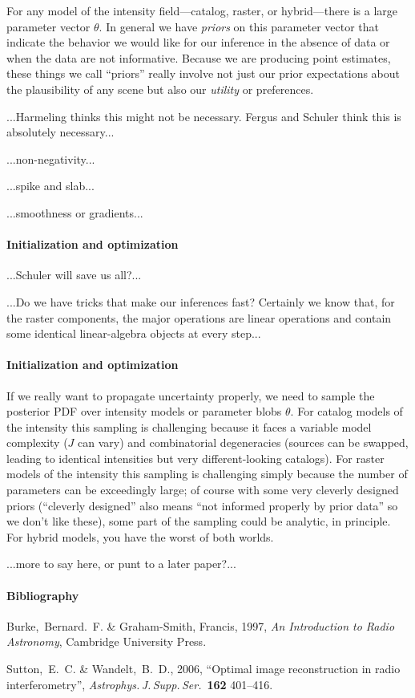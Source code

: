 \documentclass[12pt]{article}
\begin{document}
For any model of the intensity field---catalog, raster, or
hybrid---there is a large parameter vector $\theta$.  In general we
have \emph{priors} on this parameter vector that indicate the behavior
we would like for our inference in the absence of data or when the
data are not informative.  Because we are producing point estimates,
these things we call ``priors'' really involve not just our prior
expectations about the plausibility of any scene but also our
\emph{utility} or preferences.

...Harmeling thinks this might not be necessary.  Fergus and Schuler
think this is absolutely necessary...

...non-negativity...

...spike and slab...

...smoothness or gradients...

\paragraph{Initialization and optimization}

...Schuler will save us all?...

...Do we have tricks that make our inferences fast?  Certainly we know
that, for the raster components, the major operations are linear
operations and contain some identical linear-algebra objects at every
step...

\paragraph{Initialization and optimization}

If we really want to propagate uncertainty properly, we need to sample
the posterior PDF over intensity models or parameter blobs $\theta$.
For catalog models of the intensity this sampling is challenging
because it faces a variable model complexity ($J$ can vary) and
combinatorial degeneracies (sources can be swapped, leading to
identical intensities but very different-looking catalogs).  For
raster models of the intensity this sampling is challenging simply
because the number of parameters can be exceedingly large; of course
with some very cleverly designed priors (``cleverly designed'' also
means ``not informed properly by prior data'' so we don't like these),
some part of the sampling could be analytic, in principle.  For
hybrid models, you have the worst of both worlds.

...more to say here, or punt to a later paper?...

\paragraph{Bibliography}
\begin{trivlist}\raggedright
\item Burke,~Bernard.~F. \& Graham-Smith, Francis, 1997, \textit{An Introduction to Radio Astronomy}, Cambridge University Press.
\item Sutton,~E.~C. \& Wandelt,~B.~D., 2006, ``Optimal image reconstruction in radio interferometry'', \textit{Astrophys.\,J.\,Supp.\,Ser.}\ \textbf{162} 401--416.
\end{trivlist}
\end{document}
